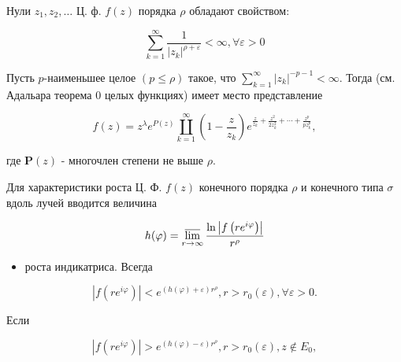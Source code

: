 \documentclass[10pt]{article}
\begin{document}
Нули $z_{1}, z_{2}, \ldots$ Ц. ф. $f(z)$ порядка $\rho$ обладают свойством:



\[

\sum_{k=1}^{\infty} \frac{1}{\left|z_{k}\right|^{\rho+\varepsilon}}<\infty, \forall \varepsilon>0

\]



Пусть $p$-наименьшее целое $(p \leqslant \rho)$ такое, что $\sum_{k=1}^{\infty}\left|z_{k}\right|^{-p-1}<\infty$. Тогда (см. Адальара теорема 0 целых функциях) имеет место представление



\[

f(z)=z^{\lambda} e^{P(z)} \coprod_{k=1}^{\infty}\left(1-\frac{z}{z_{k}}\right) e^{\frac{z}{z_{k}}+\frac{z^{2}}{2 z_{k}^{2}}+\cdots+\frac{z^{p}}{p z_{k}^{p}}},

\]



где $\boldsymbol{P}(z)$ - многочлен степени не выше $\rho$.



Для характеристики роста Ц. Ф. $f(z)$ конечного порядка $\rho$ и конечного типа $\sigma$ вдоль лучей вводится величина



\[

h(\varphi)=\varlimsup_{r \rightarrow \infty} \frac{\ln \left|f\left(r e^{i \varphi}\right)\right|}{r^{\rho}}

\]



\begin{itemize}

  \item роста индикатриса. Всегда

\end{itemize}



\[

\left|f\left(r e^{i \varphi}\right)\right|<e^{(h(\varphi)+\varepsilon) r^{\rho}}, r>r_{0}(\varepsilon), \forall \varepsilon>0 .

\]



Если



\[

\left|f\left(r e^{i \varphi}\right)\right|>e^{(h(\varphi)-\varepsilon) r^{\rho}}, r>r_{0}(\varepsilon), z \notin E_{0},

\]
\end{document}
